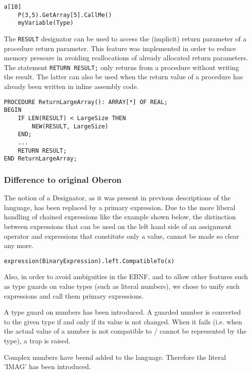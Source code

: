 \documentclass[a4wide,11pt]{article}
\begin{document}
\begin{annotation}
\begin{lstlisting}[style=example,caption=Example of Designators]
	a[10]
	P(3,5).GetArray[5].CallMe()
	myVariable(Type)
\end{lstlisting}

The \lstinline"RESULT" designator can be used to access the (implicit) return parameter of a procedure return parameter.
This feature was implemented in order to reduce memory pressure in avoiding reallocations of already allocated return parameters.
The statement \lstinline"RETURN RESULT;" only returns from a procedure without writing the result.
The latter can also be used when the return value of a procedure has already been written in inline assembly code.
\begin{lstlisting}[style=example]
PROCEDURE ReturnLargeArray(): ARRAY[*] OF REAL;
BEGIN
	IF LEN(RESULT) < LargeSize THEN
		NEW(RESULT, LargeSize)
	END;
	...
	RETURN RESULT;
END ReturnLargeArray;
\end{lstlisting}

\subsubsection{Difference to original Oberon}
The notion of a Designator, as it was present in previous descriptions of the language, has been replaced by a primary expression.
Due to the more liberal handling of chained expressions like the example shown below, the distinction between expressions that can be used on the left hand side of an assignment operator and expressions that constitute only a value, cannot be made so clear any more.
\begin{lstlisting}[style=example]
expression(BinaryExpression).left.CompatibleTo(x)
\end{lstlisting}

Also, in order to avoid ambiguities in the EBNF, and to allow other features such as type guards on value types (such as literal numbers), we chose to unify such expressions and call them primary expressions.

A type guard on numbers has been introduced. 
A guarded number is converted to the given type if and only if its value is not changed.
When it fails (i.e. when the actual value of a number is not compatible to / cannot be represented by the type), a trap is raised.

Complex numbers have beend added to the language.
Therefore the literal 'IMAG' has been introduced.


\end{annotation}
\end{document}
